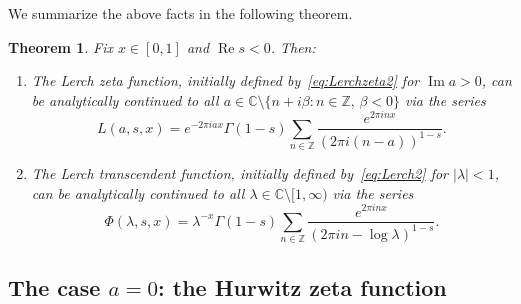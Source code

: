 \documentclass[11pt,a4paper,reqno]{amsart}
\newcommand{\C}{\mathbb{C}}
\newcommand{\Z}{\mathbb{Z}}
\renewcommand{\Re}{\operatorname{Re}}
\renewcommand{\Im}{\operatorname{Im}}
\theoremstyle{plain}
\newtheorem{theorem}{Theorem}%
\theoremstyle{remark}
\numberwithin{equation}{section}
\begin{document}
We summarize the above facts in the following theorem.

\begin{theorem}
\label{theo:SFparaL}
Fix $x\in[0,1]$ and $\Re s<0$. Then:
\begin{enumerate}
\item[(a)] The Lerch zeta function, initially defined by~\eqref{eq:Lerchzeta2} for $\Im a>0$, can be analytically continued to all $a\in \C\setminus\{n+i\beta:n\in\Z,\,\beta<0\}$ via the series
\begin{equation*}
  L(a,s,x) = e^{-2\pi iax} \Gamma(1-s) \sum_{n\in\Z} \frac{e^{2\pi inx}}{(2\pi i(n-a))^{1-s}}.
\end{equation*}
\item[(b)] The Lerch transcendent function, initially defined by~\eqref{eq:Lerch2} for $|\lambda|<1$, can be analytically continued to all $\lambda\in \C\setminus[1,\infty)$ via the series
\begin{equation*}
  \Phi(\lambda,s,x) = \lambda^{-x} \Gamma(1-s) 
  \sum_{n\in\Z} \frac{e^{2\pi inx}}{(2\pi in-\log\lambda)^{1-s}}.
\end{equation*}
\end{enumerate}
\end{theorem}

\subsection{The case \texorpdfstring{$a=0$}{a=0}: the Hurwitz zeta function} 
\end{document}
